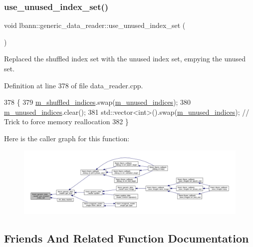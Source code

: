 \subsubsection{\texorpdfstring{use\+\_\+unused\+\_\+index\+\_\+set()}{use\_unused\_index\_set()}}
{\footnotesize\ttfamily void lbann\+::generic\+\_\+data\+\_\+reader\+::use\+\_\+unused\+\_\+index\+\_\+set (\begin{DoxyParamCaption}{ }\end{DoxyParamCaption})}

Replaced the shuffled index set with the unused index set, empying the unused set. 

Definition at line 378 of file data\+\_\+reader.\+cpp.


\begin{DoxyCode}
378                                                \{
379   \hyperlink{classlbann_1_1generic__data__reader_aaab6aeff67ffff1c689336851fec2c57}{m\_shuffled\_indices}.swap(\hyperlink{classlbann_1_1generic__data__reader_a0bc0ee42e95d23687ddcc30d6c338b19}{m\_unused\_indices});
380   \hyperlink{classlbann_1_1generic__data__reader_a0bc0ee42e95d23687ddcc30d6c338b19}{m\_unused\_indices}.clear();
381   std::vector<int>().swap(\hyperlink{classlbann_1_1generic__data__reader_a0bc0ee42e95d23687ddcc30d6c338b19}{m\_unused\_indices}); \textcolor{comment}{// Trick to force memory reallocation}
382 \}
\end{DoxyCode}
Here is the caller graph for this function\+:\nopagebreak
\begin{figure}[H]
\begin{center}
\leavevmode
\includegraphics[width=350pt]{classlbann_1_1generic__data__reader_afa621af16f1a582b5a22405b79dbe052_icgraph}
\end{center}
\end{figure}


\subsection{Friends And Related Function Documentation}
\mbox{\label{classlbann_1_1generic__data__reader_a084627f3f15bd7793e934c91fb99d366}} 
